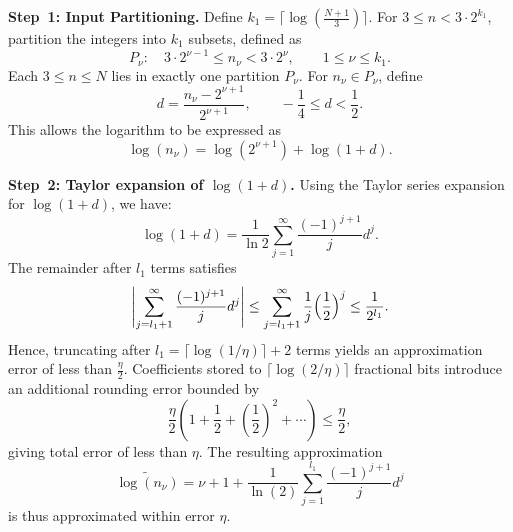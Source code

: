 \documentclass[aps,pra,twocolumn,superscriptaddress,preprintnumbers,amsmath,amssymb]{revtex4-2}
\begin{document}
\textbf{Step~1: Input Partitioning.}  
Define $k_1=\lceil\log(\tfrac{N+1}{3})\rceil$. For $3\leq n <3\cdot 2^{k_1}$, partition the integers into $k_1$ subsets, defined as
\begin{equation}
    P_\nu : \quad 3\cdot 2^{\nu-1} \leq n_\nu < 3\cdot 2^\nu, \qquad 1 \leq \nu \leq k_1.
\end{equation}
Each $3\leq n \leq N$ lies in exactly one partition $P_\nu$.
For $n_\nu \in P_\nu$, define
\begin{equation}
    d = \frac{n_\nu-2^{\nu+1}}{2^{\nu+1}}, \qquad -\frac{1}{4} \leq d < \frac{1}{2}.
\end{equation}
This allows the logarithm to be expressed as
\begin{equation}
    \log(n_\nu) = \log(2^{\nu+1}) + \log(1+d).
\end{equation}\par
\textbf{Step~2: Taylor expansion of \boldmath$\log(1+d)$.}  
Using the Taylor series expansion for \( \log(1 + d) \), we have:
\begin{equation}
    \log(1+d) = \frac{1}{\ln 2} \sum_{j=1}^\infty \frac{(-1)^{j+1}}{j} d^j.
\end{equation}
The remainder after $l_1$ terms satisfies
\begin{equation}
    \Biggl|\sum_{j=l_1+1}^{\infty} \frac{(-1)^{j+1}}{j} d^j \Biggr|
    \leq \sum_{j=l_1+1}^{\infty} \frac{1}{j} \Bigl(\frac{1}{2}\Bigr)^j
    \leq \frac{1}{2^{l_1}}.
\end{equation}
Hence, truncating after $l_1 =\lceil \log(1/\eta)\rceil+2$ terms yields an approximation error of less than \( \frac{\eta}{2} \). Coefficients stored to 
\( \lceil \log(2/\eta) \rceil \)  fractional bits introduce an additional rounding error bounded by
\begin{equation}
    \frac{\eta}{2}(1+\frac{1}{2}+(\frac{1}{2})^2+\cdots)\leq\frac{\eta}{2},
\end{equation}
giving total error of less than \( \eta \).
The resulting approximation
\begin{equation}\label{eq:taylor}
    \widetilde{\log(n_\nu)} = \nu+1 + \frac{1}{\ln(2)} \sum_{j=1}^{l_1} \frac{(-1)^{j+1}}{j} d^j
\end{equation}
is thus approximated within error $\eta$.
\end{document}
